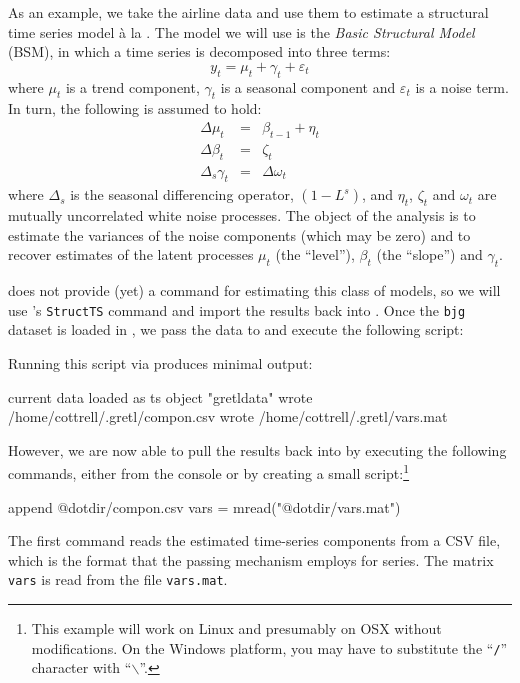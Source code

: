As an example, we take the airline data and use them to estimate a
structural time series model \`a la \cite{harvey89}. The model we will 
use is the \emph{Basic Structural Model} (BSM), in which a time series
is decomposed into three terms:
\[
  y_t = \mu_t + \gamma_t + \varepsilon_t
\]
where $\mu_t$ is a trend component, $\gamma_t$ is a seasonal component
and $\varepsilon_t$ is a noise term. In turn, the following is assumed
to hold:
\begin{eqnarray*}
  \Delta \mu_t & = & \beta_{t-1} + \eta_t \\
  \Delta \beta_t & = & \zeta_t \\
  \Delta_s \gamma_t & = & \Delta \omega_t
\end{eqnarray*}
where $\Delta_s$ is the seasonal differencing operator, $(1-L^s)$, and
$\eta_t$, $\zeta_t$ and $\omega_t$ are mutually uncorrelated white
noise processes. The object of the analysis is to estimate the
variances of the noise components (which may be zero) and to recover
estimates of the latent processes $\mu_t$ (the ``level''), $\beta_t$
(the ``slope'') and $\gamma_t$.

 does not provide (yet) a command for estimating this class
of models, so we will use 's \texttt{StructTS} command and
import the results back into . Once the \texttt{bjg}
dataset is loaded in , we pass the data to  and execute
the following script:

Running this script via  produces minimal output:
\begin{code}
current data loaded as ts object "gretldata"
wrote /home/cottrell/.gretl/compon.csv 
wrote /home/cottrell/.gretl/vars.mat 
\end{code}
However, we are now able to pull the results back into  by
executing the following commands, either from the console or by
creating a small script:\footnote{This example will work on Linux and
  presumably on OSX without modifications. On the Windows platform,
  you may have to substitute the ``\texttt{/}'' character with
  ``$\backslash$''.}
\begin{code}
append @dotdir/compon.csv
vars = mread("@dotdir/vars.mat")
\end{code}
The first command reads the estimated time-series components from a
CSV file, which is the format that the passing mechanism employs for
series. The matrix \texttt{vars} is read from the file
\texttt{vars.mat}.

